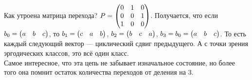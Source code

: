 \documentclass{article}
\begin{document}
\begin{itemize}
\begin{Example}
\begin{figure}[H]
            \end{figure}\noindent
            Как утроена матрица перехода? $P=\left(\begin{matrix}0&1&0\\0&0&1\\1&0&0\end{matrix}\right)$. Получается, что если $b_0=\left(\begin{matrix}a&b&c\end{matrix}\right)$, то $b_1=\left(\begin{matrix}c&a&b\end{matrix}\right)$, $b_2=\left(\begin{matrix}b&c&a\end{matrix}\right)$, $b_3=b_0=\left(\begin{matrix}a&b&c\end{matrix}\right)$. То есть каждый следующий вектор --- циклический сдвиг предыдущего. А с точки зрения эргодических классов, это всё один класс.\\
            Самое интересное, что эта цепь не забывает изначальное состояние, но более того она помнит остаток количества переходов от деления на 3.
        \end{Example}
        \begin{Example}
            \begin{figure}[H]
\end{figure}
\end{Example}
\end{itemize}
\end{document}
